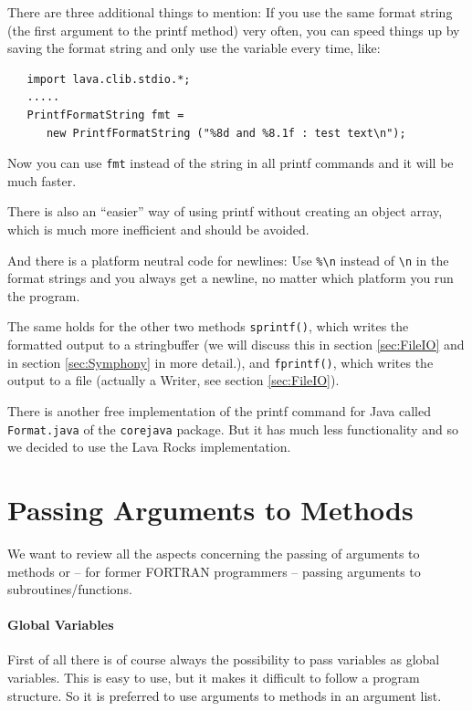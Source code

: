 There are three additional things to mention: 
If you use the
same format string (the first argument to the printf method) 
very often, you can speed things up by saving the format string
and only use the variable every time, like:
\begin{small}
\begin{verbatim}
   import lava.clib.stdio.*;
   .....
   PrintfFormatString fmt = 
      new PrintfFormatString ("%8d and %8.1f : test text\n");
\end{verbatim}
\end{small}
Now you can use \verb|fmt| instead of the string in all printf commands
and it will be much faster.

There is also an ``easier'' way of using printf without creating
an object array, which is much more inefficient and should be avoided.

And there is a platform neutral code for newlines: Use \verb|%\n| instead
of \verb|\n| in the format strings and you always get a newline,
no matter which platform you run the program.

The same holds for the other two methods \verb|sprintf()|, which writes
the formatted output to a stringbuffer (we will discuss this in section
\ref{sec:FileIO} and in section \ref{sec:Symphony} in more detail.),
and \verb|fprintf()|, which writes the output to a file (actually a
Writer, see section \ref{sec:FileIO}).

There is another free implementation of the printf command for
Java called \verb|Format.java| of the \verb|corejava| package.
But it has much less functionality and so we decided to use
the Lava Rocks implementation.

\section{Passing Arguments to Methods}
\label{sec:PassingArguments}
We want to review all the aspects concerning the passing of
arguments to methods or -- for former FORTRAN programmers --
passing arguments to subroutines/functions.

\paragraph{Global Variables}
First of all there is of course always the possibility to 
pass variables as global variables. This is easy to use,
but it makes it difficult to follow a program structure.
So it is preferred to use arguments to methods in an
argument list.

